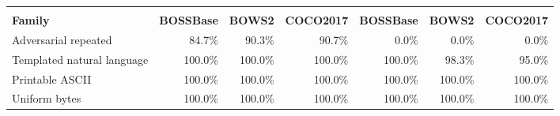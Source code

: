 \begin{tabular}{lrrrrrr}
\toprule
&  &  \\
\textbf{Family} & \textbf{BOSSBase} & \textbf{BOWS2} & \textbf{COCO2017} & \textbf{BOSSBase} & \textbf{BOWS2} & \textbf{COCO2017} \\
\midrule
Adversarial repeated & 84.7\% & 90.3\% & 90.7\% & 0.0\% & 0.0\% & 0.0\% \\
Templated natural language & 100.0\% & 100.0\% & 100.0\% & 100.0\% & 98.3\% & 95.0\% \\
Printable ASCII & 100.0\% & 100.0\% & 100.0\% & 100.0\% & 100.0\% & 100.0\% \\
Uniform bytes & 100.0\% & 100.0\% & 100.0\% & 100.0\% & 100.0\% & 100.0\% \\
\bottomrule
\end{tabular}
